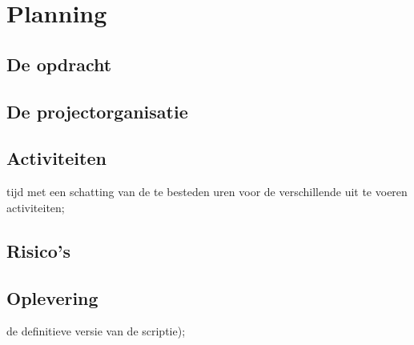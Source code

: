\chapter{Planning} %

\section{De opdracht} %

\section{De projectorganisatie} %

\section{Activiteiten} %
tijd met een schatting van de te besteden uren voor de verschillende uit te voeren activiteiten;

\section{Risico's} %

\section{Oplevering}

de definitieve versie van de scriptie);